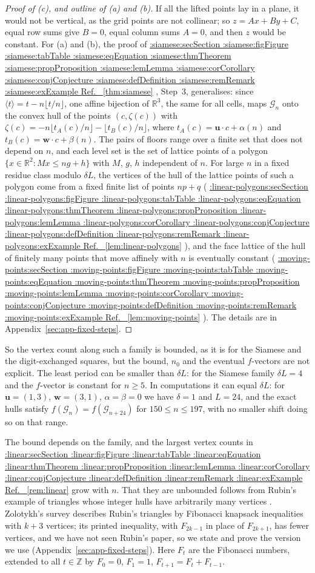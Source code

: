 \documentclass[11pt,a4paper]{article}
\makeatletter
\def\Cref@getprefix#1:#2\relax{#1}
\def\Cref@prefix@sec{sec}
\def\Cref@prefix@fig{fig}
\def\Cref@prefix@tab{tab}
\def\Cref@prefix@eq{eq}
\def\Cref@prefix@thm{thm}
\def\Cref@prefix@prop{prop}
\def\Cref@prefix@lem{lem}
\def\Cref@prefix@cor{cor}
\def\Cref@prefix@conj{conj}
\def\Cref@prefix@def{def}
\def\Cref@prefix@rem{rem}
\def\Cref@prefix@ex{ex}
\def\Cref@type@cap#1{%
  \edef\Cref@tmp{#1}%
  \ifx\Cref@tmp\Cref@prefix@sec Section%
  \else\ifx\Cref@tmp\Cref@prefix@fig Figure%
  \else\ifx\Cref@tmp\Cref@prefix@tab Table%
  \else\ifx\Cref@tmp\Cref@prefix@eq Equation%
  \else\ifx\Cref@tmp\Cref@prefix@thm Theorem%
  \else\ifx\Cref@tmp\Cref@prefix@prop Proposition%
  \else\ifx\Cref@tmp\Cref@prefix@lem Lemma%
  \else\ifx\Cref@tmp\Cref@prefix@cor Corollary%
  \else\ifx\Cref@tmp\Cref@prefix@conj Conjecture%
  \else\ifx\Cref@tmp\Cref@prefix@def Definition%
  \else\ifx\Cref@tmp\Cref@prefix@rem Remark%
  \else\ifx\Cref@tmp\Cref@prefix@ex Example%
  \else Ref.%
  \fi\fi\fi\fi\fi\fi\fi\fi\fi\fi\fi\fi
}
\DeclareRobustCommand{\Cref}[1]{%
  \begingroup
  \edef\Cref@label{#1}%
  \edef\Cref@prefix{\expandafter\Cref@getprefix\Cref@label:\relax}%
  \hyperref[#1]{\Cref@type@cap{\Cref@prefix}~\ref*{#1}}%
  \endgroup
}
\theoremstyle{plain}
\theoremstyle{definition}
\theoremstyle{remark}
\newcommand{\R}{\mathbb{R}}
\newcommand{\Z}{\mathbb{Z}}
\makeatother
\begin{document}
\begin{proof}[Proof of (c), and outline of (a) and (b)]
If all the lifted points lay in a plane, it would not be vertical, as the grid points are not collinear; so $z=Ax+By+C$, equal row sums give $B=0$, equal column sums $A=0$, and then $z$ would be constant.
For (a) and (b), the proof of \Cref{thm:siamese}, Step~3, generalises: since $\langle t\rangle=t-n\lfloor t/n\rfloor$, one affine bijection of $\R^3$, the same for all cells, maps $\mathcal G_n$ onto the convex hull of the points $(c,\zeta(c))$ with $\zeta(c)=-n\lfloor t_A(c)/n\rfloor-\lfloor t_B(c)/n\rfloor$, where $t_A(c)=\mathbf u\cdot c+\alpha(n)$ and $t_B(c)=\mathbf w\cdot c+\beta(n)$.
The pairs of floors range over a finite set that does not depend on $n$, and each level set is the set of lattice points of a polygon $\{x\in\R^2:Mx\le ng+h\}$ with $M$, $g$, $h$ independent of $n$.
For large $n$ in a fixed residue class modulo $\delta L$, the vertices of the hull of the lattice points of such a polygon come from a fixed finite list of points $np+q$ (\Cref{lem:linear-polygons}), and the face lattice of the hull of finitely many points that move affinely with $n$ is eventually constant (\Cref{lem:moving-points}).
The details are in Appendix~\ref{sec:app-fixed-steps}.
\end{proof}

So the vertex count along such a family is bounded, as it is for the Siamese and the digit-exchanged squares, but the bound, $n_0$ and the eventual $f$-vectors are not explicit.
The least period can be smaller than $\delta L$: for the Siamese family $\delta L=4$ and the $f$-vector is constant for $n\ge5$.
In computations it can equal $\delta L$: for $\mathbf u=(1,3)$, $\mathbf w=(3,1)$, $\alpha=\beta=0$ we have $\delta=1$ and $L=24$, and the exact hulls satisfy $f(\mathcal G_n)=f(\mathcal G_{n+24})$ for $150\le n\le197$, with no smaller shift doing so on that range.

The bound depends on the family, and the largest vertex counts in \Cref{rem:linear} grow with $n$.
That they are unbounded follows from Rubin's example of triangles whose integer hulls have arbitrarily many vertices \cite{rubin1970}.
Zolotykh's survey \cite[Sect.~3]{zolotykh2006vertices} describes Rubin's triangles by Fibonacci knapsack inequalities with $k+3$ vertices; its printed inequality, with $F_{2k-1}$ in place of $F_{2k+1}$, has fewer vertices, and we have not seen Rubin's paper, so we state and prove the version we use (Appendix~\ref{sec:app-fixed-steps}).
Here $F_t$ are the Fibonacci numbers, extended to all $t\in\Z$ by $F_0=0$, $F_1=1$, $F_{t+1}=F_t+F_{t-1}$.
\end{document}
